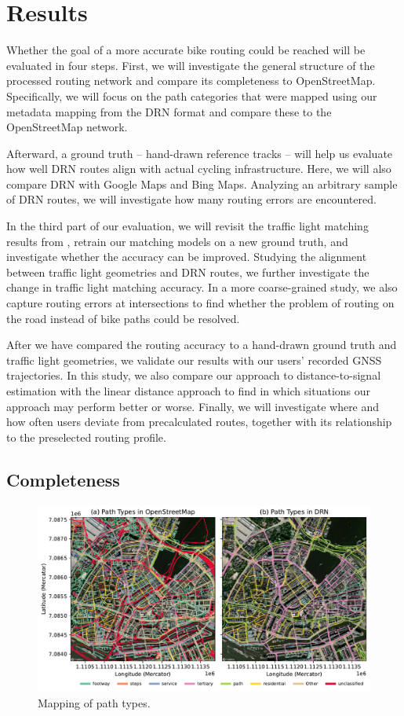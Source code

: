 \section{Results}

Whether the goal of a more accurate bike routing could be reached will be evaluated in four steps. First, we will investigate the general structure of the processed routing network and compare its completeness to OpenStreetMap. Specifically, we will focus on the path categories that were mapped using our metadata mapping from the DRN format and compare these to the OpenStreetMap network. 

Afterward, a ground truth -- hand-drawn reference tracks -- will help us evaluate how well DRN routes align with actual cycling infrastructure. Here, we will also compare DRN with Google Maps and Bing Maps. Analyzing an arbitrary sample of DRN routes, we will investigate how many routing errors are encountered.

In the third part of our evaluation, we will revisit the traffic light matching results from , retrain our matching models on a new ground truth, and investigate whether the accuracy can be improved. Studying the alignment between traffic light geometries and DRN routes, we further investigate the change in traffic light matching accuracy. In a more coarse-grained study, we also capture routing errors at intersections to find whether the problem of routing on the road instead of bike paths could be resolved. 

After we have compared the routing accuracy to a hand-drawn ground truth and traffic light geometries, we validate our results with our users' recorded GNSS trajectories. In this study, we also compare our approach to distance-to-signal estimation with the linear distance approach to find in which situations our approach may perform better or worse. Finally, we will investigate where and how often users deviate from precalculated routes, together with its relationship to the preselected routing profile.

\subsection{Completeness}

\begin{figure}[t]
\centering
\includegraphics[width=\linewidth]{images/routing-drn-osm-map.pdf}
\caption{Mapping of path types.}
\label{fig:routing-drn-osm-map}
\end{figure}

